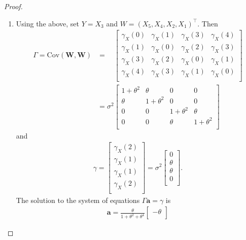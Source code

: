 \documentclass[12pt]{article}
\theoremstyle{definition}
\newcommand{\Co}[2]{\text{Cov}({#1}, {#2})}
\newcommand{\vect}[1]{\boldsymbol{#1}}
\begin{document}
\begin{proof}
\begin{enumerate}
    \item Using the above, set $Y = X_3$ and $W = (X_5, X_4, X_2, X_1)^\intercal$. Then
      \begin{align*}
        \Gamma = \Co{\vect{W}}{\vect{W}} &=
        \phantom{\sigma^2}
        \begin{bmatrix}
          \gamma_X(0) & \gamma_X(1) & \gamma_X(3) & \gamma_X(4) \\
          \gamma_X(1) & \gamma_X(0) & \gamma_X(2) & \gamma_X(3) \\
          \gamma_X(3) & \gamma_X(2) & \gamma_X(0) & \gamma_X(1) \\
          \gamma_X(4) & \gamma_X(3) & \gamma_X(1) & \gamma_X(0) \\
        \end{bmatrix}\\
        &=
        \sigma^2
        \begin{bmatrix}
          1 + \theta^2 & \theta & 0 & 0 \\
          \theta & 1 + \theta^2 & 0 & 0 \\
          0 & 0 & 1 + \theta^2 & \theta \\
          0 & 0 & \theta & 1 + \theta^2 \\
        \end{bmatrix}
      \end{align*}
      and
      \begin{align*}
        \gamma =
        \begin{bmatrix}
          \gamma_X(2) \\
          \gamma_X(1) \\
          \gamma_X(1) \\
          \gamma_X(2) \\
        \end{bmatrix}
        = \sigma^2
        \begin{bmatrix}
          0 \\
          \theta \\
          \theta \\
          0 \\
        \end{bmatrix}.
      \end{align*}
      The solution to the system of equations $\Gamma \vect{a} = \gamma$ is
      \begin{align*}
        \vect{a} = \frac{\theta}{1 + \theta^2 + \theta^4}
        \begin{bmatrix}
          -\theta \\

\end{bmatrix}
\end{align*}
\end{enumerate}
\end{proof}
\end{document}
